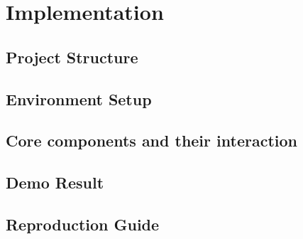 \chapter{Implementation}

\section{Project Structure}

\section{Environment Setup}

\section{Core components and their interaction}

\section{Demo Result}

\section{Reproduction Guide}
